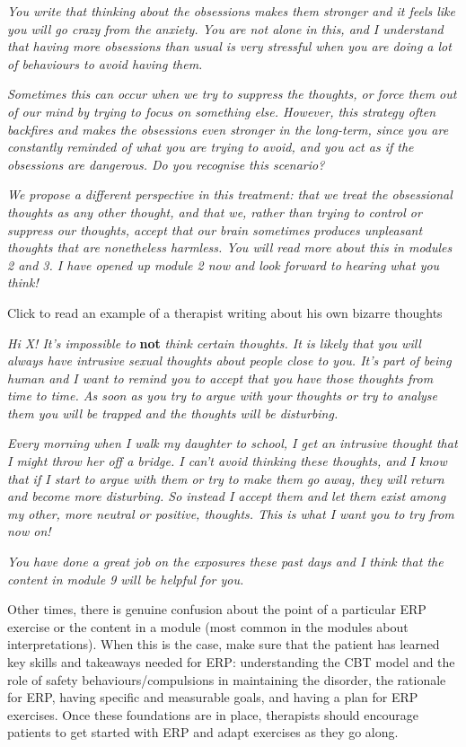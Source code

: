 \documentclass[]{book}
\theoremstyle{definition}
\theoremstyle{definition}
\theoremstyle{definition}
\theoremstyle{remark}
\begin{document}
\emph{You write that thinking about the obsessions makes them stronger
and it feels like you will go crazy from the anxiety. You are not alone
in this, and I understand that having more obsessions than usual is very
stressful when you are doing a lot of behaviours to avoid having them.}

\emph{Sometimes this can occur when we try to suppress the thoughts, or
force them out of our mind by trying to focus on something else.
However, this strategy often backfires and makes the obsessions even
stronger in the long-term, since you are constantly reminded of what you
are trying to avoid, and you act as if the obsessions are dangerous. Do
you recognise this scenario?}

\emph{We propose a different perspective in this treatment: that we
treat the obsessional thoughts as any other thought, and that we, rather
than trying to control or suppress our thoughts, accept that our brain
sometimes produces unpleasant thoughts that are nonetheless harmless.
You will read more about this in modules 2 and 3. I have opened up
module 2 now and look forward to hearing what you think!}

 Click to read an example of a therapist writing about his own bizarre
thoughts

\emph{Hi X! It's impossible to} \textbf{not} \emph{think certain
thoughts. It is likely that you will always have intrusive sexual
thoughts about people close to you. It's part of being human and I want
to remind you to accept that you have those thoughts from time to time.
As soon as you try to argue with your thoughts or try to analyse them
you will be trapped and the thoughts will be disturbing.}

\emph{Every morning when I walk my daughter to school, I get an
intrusive thought that I might throw her off a bridge. I can't avoid
thinking these thoughts, and I know that if I start to argue with them
or try to make them go away, they will return and become more
disturbing. So instead I accept them and let them exist among my other,
more neutral or positive, thoughts. This is what I want you to try from
now on!}

\emph{You have done a great job on the exposures these past days and I
think that the content in module 9 will be helpful for you.}

Other times, there is genuine confusion about the point of a particular
ERP exercise or the content in a module (most common in the modules
about interpretations). When this is the case, make sure that the
patient has learned key skills and takeaways needed for ERP:
understanding the CBT model and the role of safety
behaviours/compulsions in maintaining the disorder, the rationale for
ERP, having specific and measurable goals, and having a plan for ERP
exercises. Once these foundations are in place, therapists should
encourage patients to get started with ERP and adapt exercises as they
go along.
\end{document}

